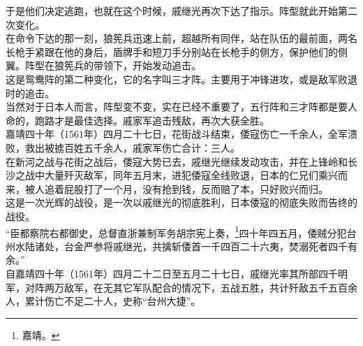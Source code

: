 \begin{multicols}{\theparacolNo}
于是他们决定逃跑，也就在这个时候，戚继光再次下达了指示。阵型就此开始第二次变化。\\

在命令下达的那一刻，狼筅兵迅速上前，超越所有同伴，站在队伍的最前面，两名长枪手紧跟在他的身后，盾牌手和短刀手分别站在长枪手的侧方，保护他们的侧翼。阵型在狼筅兵的带领下，开始发动追击。\\

这是鸳鸯阵的第二种变化，它的名字叫三才阵。主要用于冲锋进攻，或是敌军败退时的追击。\\

当然对于日本人而言，阵型变不变，实在已经不重要了，五行阵和三才阵都是要人命的，跑路才是最佳选择。戚家军追击残敌，再次大获全胜。\\

嘉靖四十年（1561年）四月二十七日，花街战斗结束，倭寇伤亡一千余人，全军溃败，救出被掳百姓五千余人，戚家军伤亡合计：三人。\\

在新河之战与花街之战后，倭寇大势已去，戚继光继续发动攻击，并在上锋岭和长沙之战中大量歼灭敌军，同年五月末，进犯倭寇全线败退，日本的仁兄们乘兴而来，被人追着屁股打了一个月，没有抢到钱，反而赔了本，只好败兴而归。\\

这是一次光辉的战役，是一次以戚继光的彻底胜利，日本倭寇的彻底失败而告终的战役。\\

“臣都察院右都御史，总督直浙兼制军务胡宗宪上奏，\footnote{嘉靖。}四十年四五月，倭贼分犯台州水陆诸处，台金严参将戚继光，共擒斩倭首一千四百二十六夷，焚溺死者四千有余。”\\

自嘉靖四十年（1561年）四月二十二日至五月二十七日，戚继光率其所部四千明军，对阵两万敌军，在无其它军队配合的情况下，五战五胜，共计歼敌五千五百余人，累计伤亡不足二十人，史称“台州大捷”。\\
\ifnum{}
	\end{multicols}
\fi
\newpage
